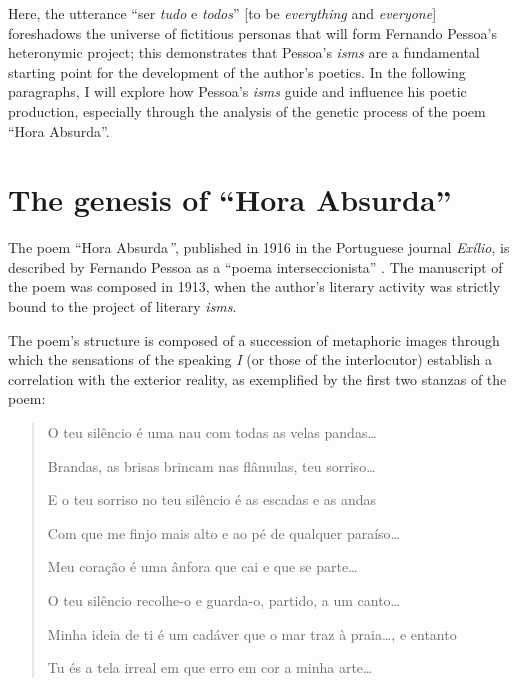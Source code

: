 \begin{paper}
\begin{quote}
\begin{flushright}
    \parencite[149]{pessoa_sensacionismo_2009}
\end{flushright}
\end{quote}

\noindent Here, the utterance ``ser \emph{tudo} e \emph{todos}'' [to be \emph{everything} and \emph{everyone}] foreshadows the universe
of fictitious personas that will form Fernando Pessoa's heteronymic
project; this demonstrates that Pessoa's \emph{isms} are a fundamental
starting point for the development of the author's poetics. In the
following paragraphs, I will explore how Pessoa's \emph{isms} guide and
influence his poetic production, especially through the analysis of the
genetic process of the poem ``Hora Absurda''.

\section{The genesis of ``Hora Absurda''}

The poem ``Hora Absurda\emph{''}, published in 1916 in the Portuguese
journal \emph{Exílio}, is described by Fernando Pessoa as a ``poema
interseccionista'' \citep[116]{pessoa_sensacionismo_2009}. The manuscript of the poem was
composed in 1913, when the author's literary activity was strictly bound
to the project of literary \emph{isms}.

The poem's structure is composed of a succession of metaphoric images
through which the sensations of the speaking \emph{I} (or those of the
interlocutor) establish a correlation with the exterior reality, as
exemplified by the first two stanzas of the poem:

\begin{quote}
\begin{minipage}{.9\textwidth}
O teu silêncio é uma nau com todas as velas pandas\ldots{}

Brandas, as brisas brincam nas flâmulas, teu sorriso\ldots{}

E o teu sorriso no teu silêncio é as escadas e as andas

Com que me finjo mais alto e ao pé de qualquer paraíso\ldots{}

Meu coração é uma ânfora que cai e que se parte\ldots{}

O teu silêncio recolhe-o e guarda-o, partido, a um canto\ldots{}

Minha ideia de ti é um cadáver que o mar traz à praia\ldots{}, e entanto

Tu és a tela irreal em que erro em cor a minha arte\ldots{}
\end{minipage}


\end{quote}
\end{paper}
